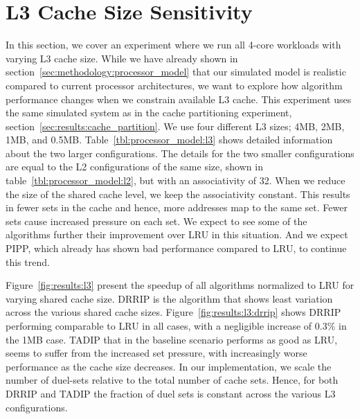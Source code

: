 \section{L3 Cache Size Sensitivity}
\label{sec:results:l3size_sensitivity}

In this section, we cover an experiment where we run all 4-core workloads with varying L3 cache size.
While we have already shown in section~\ref{sec:methodology:processor_model} that our simulated model is realistic compared to current processor architectures, we want to explore how algorithm performance changes when we constrain available L3 cache.
This experiment uses the same simulated system as in the cache partitioning experiment, section~\ref{sec:results:cache_partition}.
We use four different L3 sizes; 4MB, 2MB, 1MB, and 0.5MB.
Table~\ref{tbl:processor_model:l3} shows detailed information about the two larger configurations.
The details for the two smaller configurations are equal to the L2 configurations of the same size, shown in table~\ref{tbl:processor_model:l2}, but with an associativity of 32.
When we reduce the size of the shared cache level, we keep the associativity constant.
This results in fewer sets in the cache and hence, more addresses map to the same set.
Fewer sets cause increased pressure on each set.
We expect to see some of the algorithms further their improvement over LRU in this situation.
And we expect PIPP, which already has shown bad performance compared to LRU, to continue this trend.

Figure~\ref{fig:results:l3} present the speedup of all algorithms normalized to LRU for varying shared cache size.
DRRIP is the algorithm that shows least variation across the various shared cache sizes.
Figure~\ref{fig:results:l3:drrip} shows DRRIP performing comparable to LRU in all cases, with a negligible increase of 0.3\% in the 1MB case.
TADIP that in the baseline scenario performs as good as LRU, seems to suffer from the increased set pressure, with increasingly worse performance as the cache size decreases.
In our implementation, we scale the number of duel-sets relative to the total number of cache sets.
Hence, for both DRRIP and TADIP the fraction of duel sets is constant across the various L3 configurations.

